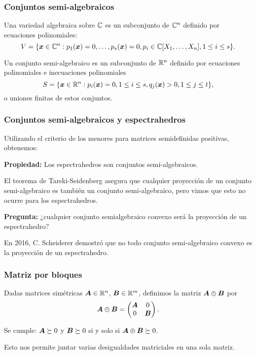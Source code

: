 \documentclass[aspectratio=169,12pt,spanish]{beamer}
\begin{document}

\begin{frame}
\frametitle{Conjuntos semi-algebraicos}

Una variedad algebraica sobre $\mathbb{C}$ es un subconjunto de $\mathbb{C}^n$ definido por ecuaciones polinomiales:
$$
V = \{\bm{x} \in \mathbb{C}^n : p_1(\bm{x}) = 0, \dots, p_s(\bm{x}) = 0, p_i \in \mathbb{C}[X_1, \dots, X_n], 1 \le i \le s\}.
$$

Un conjunto semi-algebraico es un subconjunto de $\mathbb{R}^n$ definido por ecuaciones polinomiales e inecuaciones polinomiales
$$
S = \{\bm{x} \in \mathbb{R}^n : p_i(\bm{x}) = 0, 1 \le i \le s, q_j(\bm{x}) > 0, 1 \le j \le t\},
$$ o uniones finitas de estos conjuntos.

\end{frame}


\begin{frame}
\frametitle{Conjuntos semi-algebraicos y espectrahedros}

Utilizando el criterio de los menores para matrices semidefinidas positivas, obtenemos:

\textbf{Propiedad:} Los espectrahedros son conjuntos semi-algebraicos.

El teorema de Tarski-Seidenberg asegura que cualquier proyección de un conjunto semi-algebraico es también un conjunto semi-algebraico, pero vimos que esto no ocurre para los espectrahedros.

\textbf{Pregunta:} ¿cualquier conjunto semialgebraico convexo será la proyección de un espectrahedro?

En 2016, C. Scheiderer demostró que no todo conjunto semi-algebraico convexo es la proyección de un espectrahedro.

\end{frame}


\begin{frame}
\frametitle{Matriz por bloques}

Dadas matrices simétricas $\bm{A} \in \mathbb{R}^{n}$, $\bm{B} \in \mathbb{R}^{m}$, definimos la matriz $\bm{A} \oplus \bm{B}$ por
$$
\bm{A} \oplus \bm{B} =
\begin{pmatrix}
\bm{A} & 0 \\
0 & \bm{B}
\end{pmatrix}.
$$

Se cumple: $\bm{A} \succeq 0$ y $\bm{B} \succeq 0$ si y solo si $\bm{A} \oplus \bm{B} \succeq 0$.

Esto nos permite juntar varias desigualdades matriciales en una sola matriz.

\end{frame}
\end{document}
